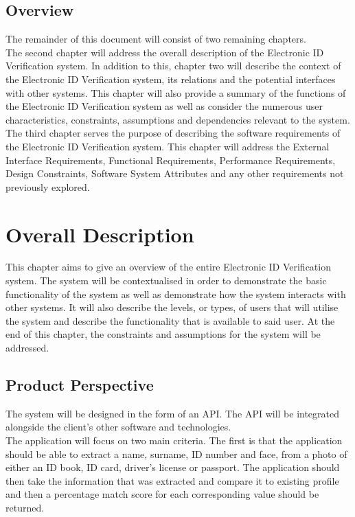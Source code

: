 \documentclass{article}
\def \project{Electronic ID Verification }
\begin{document}
		\subsection{Overview}\label{subsec:overview}
			The remainder of this document will consist of two remaining chapters.\\

            \noindent The second chapter will address the overall description of the \project system. In addition to this, chapter two will describe the context of the \project system, its relations and the potential interfaces with other systems. This chapter will also provide a summary of the functions of the \project system as well as consider the numerous user characteristics, constraints, assumptions and dependencies relevant to the system.\\
            
            \noindent The third chapter serves the purpose of describing the software requirements of the \project system. This chapter will address the External Interface Requirements, Functional Requirements, Performance Requirements, Design Constraints, Software System Attributes and any other requirements not previously explored.\\

	\cleardoublepage

	\section{Overall Description}\label{sec:overall-description}
		This chapter aims to give an overview of the entire \project system. The system will be contextualised in order to demonstrate the basic functionality of the system as well as demonstrate how the system interacts with other systems. It will also describe the levels, or types, of users that will utilise the system and describe the functionality that is available to said user. At the end of this chapter, the constraints and assumptions for the system will be addressed.

		\subsection{Product Perspective}\label{subsec:overall-product-perspective}
		The system will be designed in the form of an API. The API will be integrated alongside the client's other software and technologies.\\
		
		 \noindent The application will focus on two main criteria. The first is that the application should be able to extract a name, surname, ID number and face, from a photo of either an ID book, ID card, driver's license or passport. The application should then take the information that was extracted and compare it to existing profile and then a percentage match score for each corresponding value should be returned.\\
		 
\end{document}
